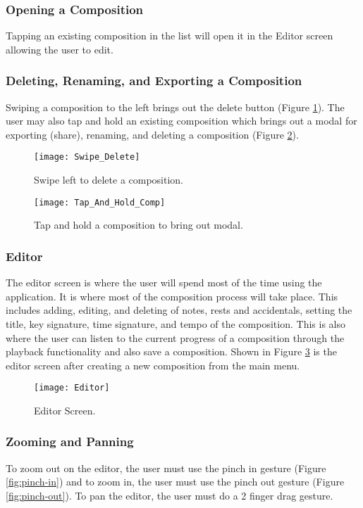\subsubsection{Opening a Composition}
Tapping an existing composition in the list will open it in the Editor screen allowing the user to edit. 

\subsubsection{Deleting, Renaming, and Exporting a Composition}
Swiping a composition to the left brings out the delete button (Figure \ref{fig:swipe-delete}). The user may also tap and hold an existing composition which brings out a modal for exporting (share), renaming, and deleting a composition (Figure \ref{fig:tap-hold-comp}).

\begin{figure}[H]
	\centering
	\texttt{[image: Swipe\_Delete]}
    \caption{Swipe left to delete a composition.}
    \label{fig:swipe-delete}
\end{figure}

\begin{figure}[H]
	\centering
	\texttt{[image: Tap\_And\_Hold\_Comp]}
    \caption{Tap and hold a composition to bring out modal.}
    \label{fig:tap-hold-comp}
\end{figure}

\subsubsection{Editor}

The editor screen is where the user will spend most of the time using the application. It is where most of the composition process will take place. This includes adding, editing, and deleting of notes, rests and accidentals, setting the title, key signature, time signature, and tempo of the composition. This is also where the user can listen to the current progress of a composition through the playback functionality and also save a composition. Shown in Figure \ref{fig:editor} is the editor screen after creating a new composition from the main menu. 

\begin{figure}[H]
	\centering
	\texttt{[image: Editor]}
    \caption{Editor Screen.}
    \label{fig:editor}
\end{figure}

\subsubsection{Zooming and Panning}
To zoom out on the editor, the user must use the pinch in gesture (Figure \ref{fig:pinch-in}) and to zoom in, the user must use the pinch out gesture (Figure \ref{fig:pinch-out}). To pan the editor, the user must do a 2 finger drag gesture.

